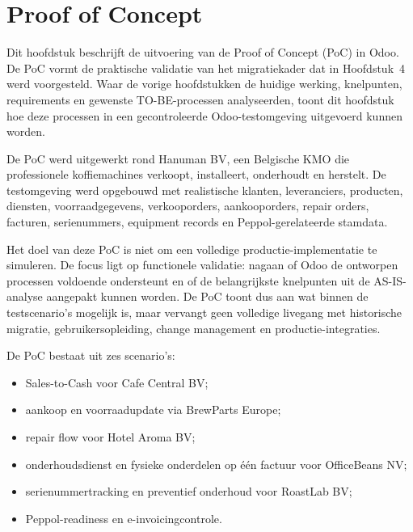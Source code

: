 
\chapter{Proof of Concept}
\label{ch:poc}

Dit hoofdstuk beschrijft de uitvoering van de Proof of Concept (PoC) in Odoo. De PoC vormt de praktische validatie van het migratiekader dat in Hoofdstuk~4 werd voorgesteld. Waar de vorige hoofdstukken de huidige werking, knelpunten, requirements en gewenste TO-BE-processen analyseerden, toont dit hoofdstuk hoe deze processen in een gecontroleerde Odoo-testomgeving uitgevoerd kunnen worden.

De PoC werd uitgewerkt rond Hanuman BV, een Belgische KMO die professionele koffiemachines verkoopt, installeert, onderhoudt en herstelt. De testomgeving werd opgebouwd met realistische klanten, leveranciers, producten, diensten, voorraadgegevens, verkooporders, aankooporders, repair orders, facturen, serienummers, equipment records en Peppol-gerelateerde stamdata.

Het doel van deze PoC is niet om een volledige productie-implementatie te simuleren. De focus ligt op functionele validatie: nagaan of Odoo de ontworpen processen voldoende ondersteunt en of de belangrijkste knelpunten uit de AS-IS-analyse aangepakt kunnen worden. De PoC toont dus aan wat binnen de testscenario's mogelijk is, maar vervangt geen volledige livegang met historische migratie, gebruikersopleiding, change management en productie-integraties.

De PoC bestaat uit zes scenario's:

\begin{itemize}
    \item Sales-to-Cash voor Cafe Central BV;
    \item aankoop en voorraadupdate via BrewParts Europe;
    \item repair flow voor Hotel Aroma BV;
    \item onderhoudsdienst en fysieke onderdelen op één factuur voor OfficeBeans NV;
    \item serienummertracking en preventief onderhoud voor RoastLab BV;
    \item Peppol-readiness en e-invoicingcontrole.
\end{itemize}

